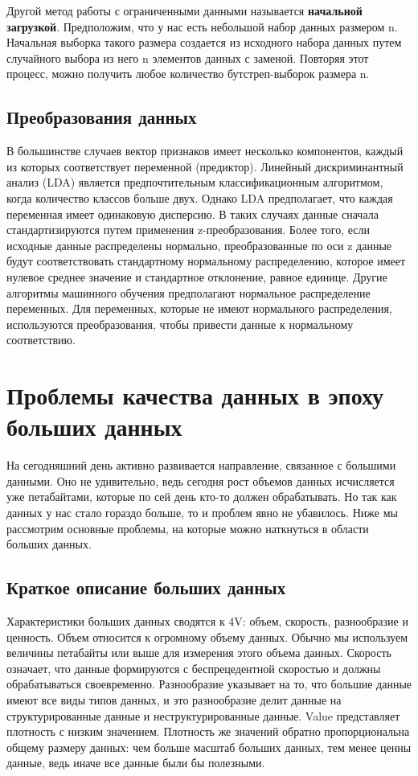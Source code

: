 \documentclass{article}
\begin{document}
Другой метод работы с ограниченными данными называется \textbf{начальной загрузкой}. Предположим, что у нас есть небольшой набор данных размером n. Начальная выборка такого размера создается из исходного набора данных путем случайного выбора из него n элементов данных с заменой. Повторяя этот процесс, можно получить любое количество бутстреп-выборок размера n.

\subsection{Преобразования данных}

В большинстве случаев вектор признаков имеет несколько компонентов, каждый из которых соответствует переменной (предиктор). Линейный дискриминантный анализ (LDA) является предпочтительным классификационным алгоритмом, когда количество классов больше двух. Однако LDA предполагает, что каждая переменная имеет одинаковую дисперсию. В таких случаях данные сначала стандартизируются путем применения z-преобразования. Более того, если исходные данные распределены нормально, преобразованные по оси z данные будут соответствовать стандартному нормальному распределению, которое имеет нулевое среднее значение и стандартное отклонение, равное единице. Другие алгоритмы машинного обучения предполагают нормальное распределение переменных. Для переменных, которые не имеют нормального распределения, используются преобразования, чтобы привести данные к нормальному соответствию.

\newpage

\section{Проблемы качества данных в эпоху больших данных}

На сегодняшний день активно развивается направление, связанное с большими данными. Оно не удивительно, ведь сегодня рост объемов данных исчисляется уже петабайтами, которые по сей день кто-то должен обрабатывать. Но так как данных у нас стало гораздо больше, то и проблем явно не убавилось. Ниже мы рассмотрим основные проблемы, на которые можно наткнуться в области больших данных.

\subsection{Краткое описание больших данных}
Характеристики больших данных сводятся к 4V: объем, скорость, разнообразие и ценность. Объем относится к огромному объему данных. Обычно мы используем величины петабайты или выше для измерения этого объема данных. Скорость означает, что данные формируются с беспрецедентной скоростью и должны обрабатываться своевременно. Разнообразие указывает на то, что большие данные имеют все виды типов данных, и это разнообразие делит данные на структурированные данные и неструктурированные данные. Value представляет плотность с низким значением. Плотность же значений обратно пропорциональна общему размеру данных: чем больше масштаб больших данных, тем менее ценны данные, ведь иначе все данные были бы полезными.
\end{document}
